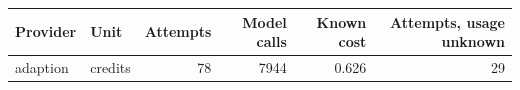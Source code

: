 \begin{tabular}{llrrrr}
\toprule
Provider & Unit & Attempts & Model calls & Known cost & Attempts, usage unknown \\
\midrule
adaption & credits & 78 & 7944 & 0.626 & 29 \\
\bottomrule
\end{tabular}
